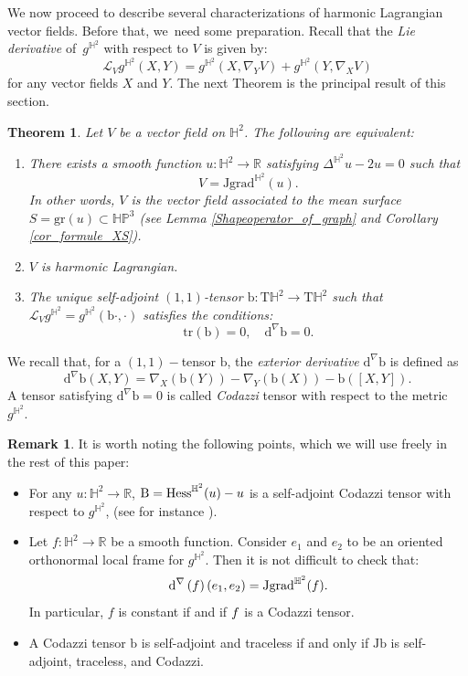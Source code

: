 \documentclass[11pt]{article}
\makeatletter
\DeclareRobustCommand{\mathbbm}[1]{\csname jepbb@#1\endcsname}
\theoremstyle{plain}
\newtheorem{theorem}[cor]{Theorem}
\theoremstyle{definition}
\newtheorem{remark}[cor]{Remark}
\newcommand{\bb}{\mathrm{b}}
\newcommand{\HP}{\mathbb{HP}^3}
\newcommand{\grad}{\mathrm{grad}^{\mathbb{H}^2}}
\newcommand{\hess}{\mathrm{Hess}^{\mathbb{H}^2}}
\newcommand{\J}{\mathrm{J}}
\newcommand{\B}{\mathrm{B}}
\makeatother
\begin{document}
We now proceed to describe several characterizations of harmonic Lagrangian vector fields. Before that, we~need some preparation.
Recall that the \emph{Lie derivative} of~$g^{\mathbb{H}^2}$ with respect to $V$ is given by:
\[
\mathcal{L}_Vg^{\mathbb{H}^2}(X,Y)=g^{\mathbb{H}^2}(X,\nabla_YV)+g^{\mathbb{H}^2}(Y,\nabla_X V)
\]
for any vector fields $X$ and $Y$.
The next Theorem is the principal result of this section.
\begin{theorem}\label{charac_HL}
Let $V$ be a vector field on $\mathbb{H}^2$. The following are equivalent:
\begin{enumerate}
\item \label{charac_HL1} There exists a smooth function $u:\mathbb{H}^2\to\mathbb{R}$ satisfying $\Delta^{\mathbb{H}^2} u-2u=0$ such that
\[
V=\J\grad(u).
\]
In other words, $V$ is the vector field associated to the mean surface $S=\mathrm{gr}(u)\subset\HP$ (see Lemma \ref{Shapeoperator_of_graph} and Corollary \ref{cor_formule_XS}).
\item \label{charac_HL2} $V$ is harmonic Lagrangian.
\item \label{charac_HL3} The unique self-adjoint $(1, 1)$-tensor $\bb:\mathrm{T}\mathbb{H}^2\to \mathrm{T}\mathbb{H}^2$ such that $\mathcal{L}_Vg^{\mathbb{H}^2}=g^{\mathbb{H}^2}(\bb\cdot,\cdot)$ satisfies the conditions:\begin{equation}\label{condition_harmonic_lagrangian}
\mathrm{tr}(\bb)=0,\quad \mathrm{d}^{\nabla}\bb=0.
\end{equation}
\end{enumerate}
\end{theorem}
We recall that, for a $(1,1)-$tensor $\bb$, the \emph{exterior derivative} $\mathrm{d}^{\nabla}\bb$ is defined as
\[
\mathrm{d}^{\nabla}\bb(X,Y) = \nabla_X(\bb(Y)) -\nabla_Y(\bb(X))-\bb([X, Y]).
\]
A tensor satisfying $\mathrm{d}^{\nabla}\bb=0$ is called \emph{Codazzi} tensor with respect to the metric $g^{\mathbb{H}^2}$.
\begin{remark}\label{remark_on_codazzi}
It is worth noting the following points, which we will use freely in the rest of this paper:
\begin{itemize}
\item For any $u:\mathbb{H}^2\to\mathbb{R}$, $\B=\hess(u)-u\mathbbm{1}$ is a self-adjoint Codazzi tensor with respect to $g^{\mathbb{H}^2}$, (see for instance \cite[Lem.\,2.1]{BS_flat_conical}).
\item Let $f:\mathbb{H}^2\to\mathbb{R}$ be a smooth function. Consider $e_1$ and $e_2$ to be an oriented orthonormal local frame
for $g^{\mathbb{H}^2}$. Then it is not difficult to check that:
\[
\mathrm{d}^{\nabla}\left(f\mathbbm{1} \right)(e_1,e_2)=\J\grad(f).
\]
In particular, $f$ is constant if and if $f\mathbbm{1}$ is a Codazzi tensor.

\item A Codazzi tensor $\bb$ is self-adjoint and traceless if and only if $\J\bb$ is self-adjoint, traceless, and Codazzi.
\end{itemize}
\end{remark}
\end{document}
